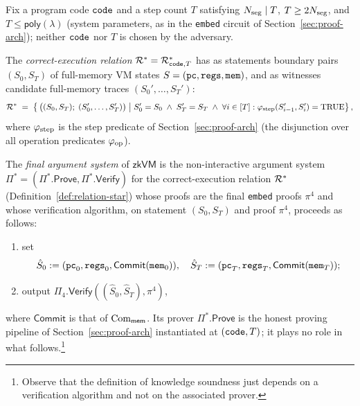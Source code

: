 \begin{definition}\label{def:relation-star}
Fix a program code $\mathtt{code}$ and a step count $T$ satisfying $N_{\mathrm{seg}}\mid T$,
$T\ge 2N_{\mathrm{seg}}$, and $T\le\mathsf{poly}(\lambda)$ (system parameters, as in the
\texttt{embed} circuit of Section~\ref{sec:proof-arch}); neither $\mathtt{code}$ nor $T$
is chosen by the adversary.

The \emph{correct-execution relation} $\mathcal{R}^*=\mathcal{R}^*_{\mathtt{code},T}$ has as
statements boundary pairs $(S_0,S_T)$ of full-memory VM states
$S=(\mathtt{pc},\mathtt{regs},\mathtt{mem})$, and as witnesses candidate full-memory traces
$(S_0',\ldots,S_T')$:
\begin{equation}\label{eq:relation-star}
  \mathcal{R}^* \;=\; \left\{\,\bigl((S_0,S_T);\;(S_0',\ldots,S_T')\bigr)\;\middle|\;
    S_0'=S_0 \;\wedge\; S_T'=S_T \;\wedge\;
    \forall i\in[T]:\varphi_{\mathrm{step}}(S_{i-1}',S_i')=\mathrm{TRUE}
  \right\},
\end{equation}
where $\varphi_{\mathrm{step}}$ is the step predicate of Section~\ref{sec:proof-arch}
(the disjunction over all operation predicates $\varphi_{\mathrm{op}}$).
\end{definition}

\begin{definition}\label{def:final-as}
The \emph{final argument system} of $\mathsf{zkVM}$ is the non-interactive
argument system $\Pi^*=(\Pi^*.\mathsf{Prove},\Pi^*.\mathsf{Verify})$ for the
correct-execution relation $\mathcal{R}^*$ (Definition~\ref{def:relation-star})
whose proofs are the final \texttt{embed} proofs $\pi^4$ and whose verification
algorithm, on statement $(S_0,S_T)$ and proof $\pi^4$, proceeds as follows:
\begin{enumerate}
  \item set
    $$\hat{S}_0 := (\mathtt{pc}_0,\mathtt{regs}_0,\mathsf{Commit}(\mathtt{mem}_0)),\quad
    \hat{S}_T := (\mathtt{pc}_T,\mathtt{regs}_T,\mathsf{Commit}(\mathtt{mem}_T));$$
  \item output $\Pi_4.\mathsf{Verify}((\hat{S}_0,\hat{S}_T),\pi^4)$,
\end{enumerate}
where $\mathsf{Commit}$ is that of $\mathrm{Com}_{\mathsf{mem}}$.  Its prover
$\Pi^*.\mathsf{Prove}$ is the honest proving pipeline of
Section~\ref{sec:proof-arch} instantiated at $(\mathtt{code},T)$; it plays no role in
what follows.\footnote{Observe that the definition of knowledge soundness just
depends on a verification algorithm and not on the associated prover.}
\end{definition}


